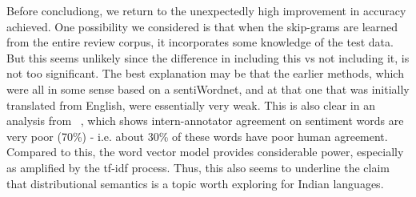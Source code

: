\def\DevnagVersion{2.15}\documentclass[11pt]{article}
\begin{document}
Before concludiong, we return to the unexpectedly high improvement
in accuracy achieved.
One possibility we considered is that when the skip-grams are
learned from the entire review corpus, it incorporates some knowledge
of the test data.  But this seems unlikely since the difference in including
this vs not including it, is not too significant.  The best explanation
may be that the earlier methods, which were all in some sense based on
a sentiWordnet, and at that one that was initially translated from English,
were essentially very weak.  This is also clear in an analysis from
~\cite{Bakliwal:12}, which
shows intern-annotator agreement on sentiment words are very poor
(70\%) - i.e. about 30\% of these words have poor human agreement. 
Compared to this, the word vector model  
provides considerable power, especially as amplified by the tf-idf
process. Thus, this also seems to underline the claim that distributional
semantics is a topic worth exploring for Indian languages. 


% 

%
%
\end{document}
